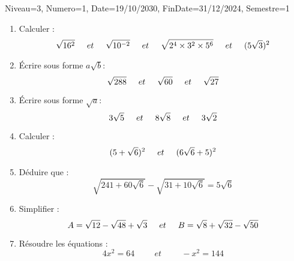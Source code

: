 \documentclass[a4paper,12pt]{article}
\begin{document}
\begin{Maquette}[DM]{Niveau=3, Numero=1, Date=19/10/2030, FinDate=31/12/2024, Semestre=1}
\begin{exercice}
\begin{enumerate}
\item Calculer :
\[ \sqrt{16^{2}} \hspace*{0.5cm} et\hspace*{0.5cm}
 \sqrt{10^{-2}} \hspace*{0.5cm}et\hspace*{0.5cm}
  \sqrt{2^{4}\times 3^{2}\times 5^{6}} \hspace*{0.5cm}et \hspace*{0.5cm}
   (5\sqrt{3})^{2}  \]
   
 \item Écrire sous forme $a\sqrt{b}$:  
 \[  \sqrt{288}\hspace*{0.5cm}et\hspace*{0.5cm}
\sqrt{60}\hspace*{0.5cm}et\hspace*{0.5cm}
\sqrt{27}   \]

\item Écrire sous forme $\sqrt{a}$:
\[  3\sqrt{5}\hspace*{0.5cm}et\hspace*{0.5cm}
8\sqrt{8}\hspace*{0.5cm}et\hspace*{0.5cm}
3\sqrt{2}   \]

\item Calculer :
\[   (5+\sqrt{6})^{2}\hspace*{0.5cm}et\hspace*{0.5cm}
	(6\sqrt{6}+5)^{2}  \]
	
\item Déduire que :
\[  \sqrt{241+60\sqrt{6}}-\sqrt{31+10\sqrt{6}}=5\sqrt{6}  \]

\item Simplifier :
\[
A=\sqrt{12}-\sqrt{48}+\sqrt{3}
\hspace*{0.5cm}et\hspace*{0.5cm}
B=\sqrt{8}+\sqrt{32}-\sqrt{50}
\]

\item Résoudre les équations :
\[
4x^{2}=64
\hspace{1cm}et\hspace{1cm}
-x^{2}=144
\]	
\end{enumerate}

\end{exercice}


\end{Maquette}
\end{document}
